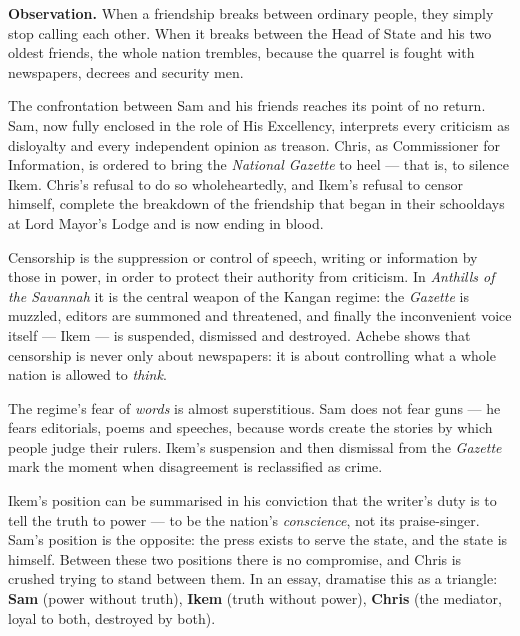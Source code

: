 \documentclass[11pt]{article}
\newcommand{\cle}[1]{{\popxbold\color{popdark}#1}}
\begin{document}
\textbf{Observation.} When a friendship breaks between ordinary people, they simply stop calling each other. When it breaks between the Head of State and his two oldest friends, the whole nation trembles, because the quarrel is fought with newspapers, decrees and security men.

The confrontation between Sam and his friends reaches its point of no return. Sam, now fully enclosed in the role of \cle{His Excellency}, interprets every criticism as disloyalty and every independent opinion as treason. Chris, as Commissioner for Information, is ordered to bring the \emph{National Gazette} to heel — that is, to silence Ikem. Chris's refusal to do so wholeheartedly, and Ikem's refusal to censor himself, complete the \cle{breakdown of the friendship} that began in their schooldays at Lord Mayor's Lodge and is now ending in blood.

\begin{definition}[Censorship]
\cle{Censorship} is the suppression or control of speech, writing or information by those in power, in order to protect their authority from criticism. In \emph{Anthills of the Savannah} it is the central weapon of the Kangan regime: the \emph{Gazette} is muzzled, editors are summoned and threatened, and finally the inconvenient voice itself — Ikem — is suspended, dismissed and destroyed. Achebe shows that censorship is never only about newspapers: it is about controlling what a whole nation is allowed to \emph{think}.
\end{definition}

The regime's fear of \emph{words} is almost superstitious. Sam does not fear guns — he fears \cle{editorials}, poems and speeches, because words create the stories by which people judge their rulers. Ikem's suspension and then dismissal from the \emph{Gazette} mark the moment when disagreement is reclassified as crime.

\begin{exemplebox}
Ikem's position can be summarised in his conviction that the writer's duty is to tell the truth to power — to be the nation's \emph{conscience}, not its praise-singer. Sam's position is the opposite: the press exists to serve the state, and the state is himself. Between these two positions there is no compromise, and Chris is crushed trying to stand between them. In an essay, dramatise this as a triangle: \textbf{Sam} (power without truth), \textbf{Ikem} (truth without power), \textbf{Chris} (the mediator, loyal to both, destroyed by both).
\end{exemplebox}
\end{document}

